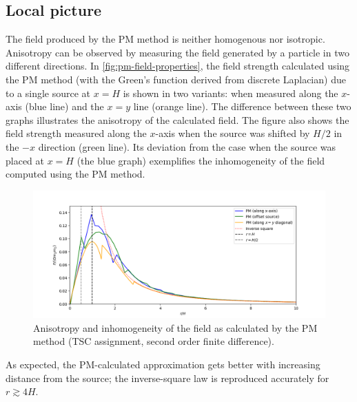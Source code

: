 \subsection{Local picture}
The field produced by the PM method is neither homogenous nor isotropic.
Anisotropy can be observed by measuring the field generated by a particle in two different directions.
In \autoref{fig:pm-field-properties}, the field strength calculated using the PM method (with the Green's function derived from discrete Laplacian) due to a single source at $x = H$ is shown in two variants: when measured along the $x$-axis (blue line) and the $x=y$ line (orange line).
The difference between these two graphs illustrates the anisotropy of the calculated field.
The figure also shows the field strength measured along the $x$-axis when the source was shifted by $H/2$ in the $-x$ direction (green line).
Its deviation from the case when the source was placed at $x=H$ (the blue graph) exemplifies the inhomogeneity of the field computed using the PM method.
\begin{figure}[htp]
    \centering
    \includegraphics[scale=0.55]{chapters/pm-method/img/pm-field-combined.png}
    \caption{Anisotropy and inhomogeneity of the field as calculated by the PM method (TSC assignment, second order finite difference).}
    \label{fig:pm-field-properties}
\end{figure}
As expected, the PM-calculated approximation gets better with increasing distance from the source;
the inverse-square law is reproduced accurately for $r \gtrsim 4H$.


